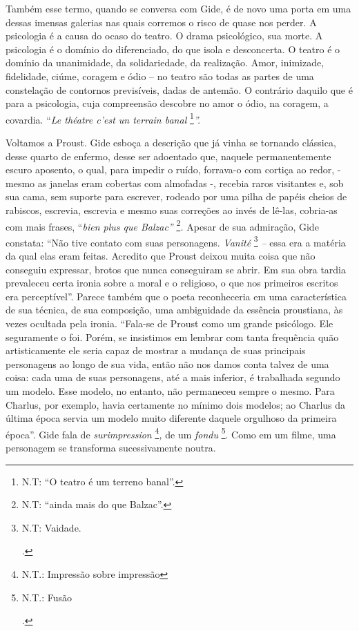 Também esse termo, quando se conversa com Gide, é de novo uma porta em
uma dessas imensas galerias nas quais corremos o risco de quase nos
perder. A psicologia é a causa do ocaso do teatro. O drama psicológico,
sua morte. A psicologia é o domínio do diferenciado, do que isola e
desconcerta. O teatro é o domínio da unanimidade, da solidariedade, da
realização. Amor, inimizade, fidelidade, ciúme, coragem e ódio -- no
teatro são todas as partes de uma constelação de contornos previsíveis,
dadas de antemão. O contrário daquilo que é para a psicologia, cuja
compreensão descobre no amor o ódio, na coragem, a covardia. ``\emph{Le
théatre c'est un terrain banal} \footnote{N.T: ``O teatro é um terreno
  banal''.}\emph{''.}

Voltamos a Proust. Gide esboça a descrição que já vinha se tornando
clássica, desse quarto de enfermo, desse ser adoentado que, naquele
permanentemente escuro aposento, o qual, para impedir o ruído, forrava-o
com cortiça ao redor, - mesmo as janelas eram cobertas com almofadas -,
recebia raros visitantes e, sob sua cama, sem suporte para escrever,
rodeado por uma pilha de papéis cheios de rabiscos, escrevia, escrevia e
mesmo suas correções ao invés de lê-las, cobria-as com mais frases,
``\emph{bien plus que Balzac''} \footnote{N.T: ``ainda mais do que
  Balzac''.}\emph{.} Apesar de sua admiração, Gide constata: ``Não tive
contato com suas personagens. \emph{Vanité} \footnote{N.T: Vaidade.

  .} \emph{--} essa era a matéria da qual elas eram feitas. Acredito que
Proust deixou muita coisa que não conseguiu expressar, brotos que nunca
conseguiram se abrir. Em sua obra tardia prevaleceu certa ironia sobre a
moral e o religioso, o que nos primeiros escritos era perceptível''.
Parece também que o poeta reconheceria em uma característica de sua
técnica, de sua composição, uma ambiguidade da essência proustiana, às
vezes ocultada pela ironia. ``Fala-se de Proust como um grande
psicólogo. Ele seguramente o foi. Porém, se insistimos em lembrar com
tanta frequência quão artisticamente ele seria capaz de mostrar a
mudança de suas principais personagens ao longo de sua vida, então não
nos damos conta talvez de uma coisa: cada uma de suas personagens, até a
mais inferior, é trabalhada segundo um modelo. Esse modelo, no entanto,
não permaneceu sempre o mesmo. Para Charlus, por exemplo, havia
certamente no mínimo dois modelos; ao Charlus da última época servia um
modelo muito diferente daquele orgulhoso da primeira época''. Gide fala
de \emph{surimpression} \footnote{N.T.: Impressão sobre impressão}\emph{,}
de um \emph{fondu} \footnote{N.T.: Fusão

  .}. Como em um filme, uma personagem se transforma sucessivamente
noutra.

